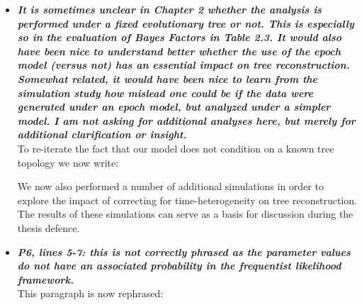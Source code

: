 \documentclass[english]{article}
\begin{document}
\begin{itemize}
\begin{itemize}
\begin{quote}
\myeditsvonec
\end{quote}

\end{itemize}

\item {
{\it
\textbf{
It is sometimes unclear in Chapter 2 whether the analysis is performed under a fixed evolutionary tree or not. 
This is especially so in the evaluation of Bayes Factors in Table 2.3. 
It would also have been nice to understand better whether the use of the epoch model (versus not) has an essential impact on tree reconstruction. 
Somewhat related, it would have been nice to learn from the simulation study how mislead one could be if the data were generated under an epoch model, but analyzed under a simpler model. 
I am not asking for additional analyses here, but merely for additional clarification or insight.
}%
}%
}%
\\
To re-iterate the fact that our model does not condition on a known tree topology we now write:

\begin{quote}
\myeditsvtwo
\end{quote}

We now also performed a number of additional simulations in order to explore the impact of correcting for time-heterogeneity on tree reconstruction.
The results of these simulations can serve as a basis for discussion during the thesis defence.


\item {
{\it
\textbf{
P6, lines 5-7: this is not correctly phrased as the parameter values do not have an associated probability in the frequentist likelihood framework.
}%
}%
}%
\\
This paragraph is now rephrased:


\end{itemize}
\end{document}

